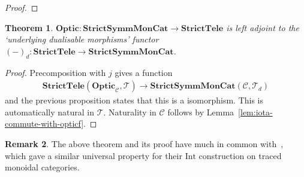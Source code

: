 \documentclass[11pt,letterpaper]{article}
\theoremstyle{plain}
\newtheorem{theorem}{Theorem}[subsection]
\theoremstyle{definition}
\newtheorem{remark}[theorem]{Remark}
\newcommand{\C}{\mathscr{C}}
\newcommand{\T}{\mathscr{T}}
\newcommand{\SymmMonCat}{\mathbf{SymmMonCat}}
\newcommand{\StrictSymmMonCat}{\mathbf{StrictSymmMonCat}}
\newcommand{\Tele}{\mathbf{Tele}}
\newcommand{\StrictTele}{\mathbf{StrictTele}}
\newcommand{\Optic}{\mathbf{Optic}}
\newcommand{\switched}{\mathbin{\tilde{\otimes}}}
\newcommand{\id}{\mathrm{id}}
\newcommand{\teletimes}{\mathbin{\boxtimes}}
\newcommand{\todo}[1]{\textcolor{red}{\small #1}}
\begin{document}
\begin{proof}
%
%
%
\end{proof}

\begin{theorem}\label{thm:optic-is-free-teleological-cat}
  $\Optic : \StrictSymmMonCat \to \StrictTele$ is left adjoint to the `underlying dualisable morphisms' functor ${(-)}_d : \StrictTele \to \StrictSymmMonCat$.
\end{theorem}
\begin{proof}
Precomposition with $j$ gives a function
\begin{align*}
\StrictTele(\Optic_\C, \T) \to \StrictSymmMonCat(\C, \T_d)
\end{align*}
and the previous proposition states that this is a isomorphism. This is automatically natural in $\T$. Naturality in $\C$ follows by Lemma~\ref{lem:iota-commute-with-opticf}. 
\end{proof}

\begin{remark}
The above theorem and its proof have much in common with~\cite[Proposition 5.2]{JoyalStreetVerity}, which gave a similar universal property for their $\mathrm{Int}$ construction on traced monoidal categories.
\end{remark}
\end{document}
